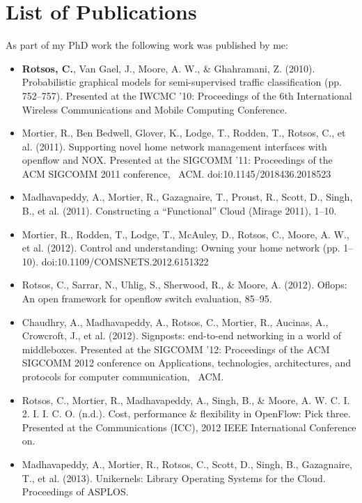 
\chapter*{List of Publications} \label{sec:intro:pubs}
As part of my PhD work the following work was published by me:
\begin{itemize}
  \item \textbf{Rotsos, C.}, Van Gael, J., Moore, A. W., \& Ghahramani, Z. (2010).
    Probabilistic graphical models for semi-supervised traffic
    classification (pp. 752–757). Presented at the IWCMC '10: Proceedings of
    the 6th International Wireless Communications and Mobile Computing
    Conference.
  \item Mortier, R., Ben Bedwell, Glover, K., Lodge, T., Rodden, T., Rotsos, C.,
    et al. (2011). Supporting novel home network management interfaces with
    openflow and NOX. Presented at the SIGCOMM '11: Proceedings of the ACM
    SIGCOMM 2011 conference,  ACM. doi:10.1145/2018436.2018523
  \item Madhavapeddy, A., Mortier, R., Gazagnaire, T., Proust, R., Scott, D.,
    Singh, B., et al. (2011). Constructing a “Functional” Cloud (Mirage
    2011), 1–10.
  \item Mortier, R., Rodden, T., Lodge, T., McAuley, D., Rotsos, C., Moore, A.
    W., et al. (2012). Control and understanding: Owning your home network
    (pp. 1–10). doi:10.1109/COMSNETS.2012.6151322
  \item Rotsos, C., Sarrar, N., Uhlig, S., Sherwood, R., \& Moore, A. (2012).
    Oflops: An open framework for openflow switch evaluation, 85–95.
  \item Chaudhry, A., Madhavapeddy, A., Rotsos, C., Mortier, R., Aucinas, A.,
    Crowcroft, J., et al. (2012). Signposts: end-to-end networking in a
    world of middleboxes. Presented at the SIGCOMM '12: Proceedings of the
    ACM SIGCOMM 2012 conference on Applications, technologies,
    architectures, and protocols for computer communication,  ACM.
  \item Rotsos, C., Mortier, R., Madhavapeddy, A., Singh, B., \& Moore, A. W. C.
    I. 2. I. I. C. O. (n.d.). Cost, performance \& flexibility in OpenFlow:
    Pick three. Presented at the Communications (ICC), 2012 IEEE
    International Conference on.
  \item Madhavapeddy, A., Mortier, R., Rotsos, C., Scott, D., Singh, B.,
    Gazagnaire, T., et al. (2013). Unikernels: Library Operating Systems for
    the Cloud. Proceedings of ASPLOS.  
\end{itemize}


